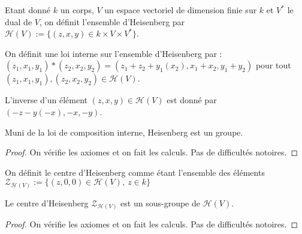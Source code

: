 \begin{definition}
    \label{def:heisenberg}
    \leanok

    Etant donné $k$ un corps, $V$ un espace vectoriel de dimension finie sur
    $k$ et $V^*$ le dual de $V$, on définit l'ensemble d'Heisenberg par 
    $\mathcal{H}(V):=\{(z,x,y) \in k\times V\times V^*\}$.
\end{definition}

\begin{definition}
    \label{def:mul_H}
    \leanok 

    On définit une loi interne sur l'ensemble d'Heisenberg par :
    $(z_1,x_1,y_1)*(z_2,x_2,y_2) = (z_1+z_2+y_1(x_2),x_1+x_2,y_1+y_2)$ pour
    tout $(z_1,x_1,y_1),(z_2,x_2,y_2)\in\mathcal{H}(V)$.
\end{definition}

\begin{definition}
    \label{def:inv_H}
    \leanok 

    L'inverse d'un élément $(z,x,y)\in\mathcal{H}(V)$ est donné par 
    $(-z- y(-x), - x ,- y)$.
\end{definition}

\begin{proposition}
    \label{prop:group_H}
    \leanok
    Muni de la loi de composition interne, Heisenberg est un groupe.
    \begin{proof}
        On vérifie les axiomes et on fait les calculs. Pas de difficultés
        notoires.
    \end{proof}
\end{proposition}

\begin{definition}
    \label{def:center_H}
    \leanok 

    On définit le centre d'Heisenberg comme étant l'ensemble des éléments
    $\mathcal{Z}_{\mathcal{H}(V)}:=\{(z,0,0)\in\mathcal{H}(V),\ z\in k\}$
\end{definition}

\begin{proposition}
    \label{prop:center_H_subgroup}
    \leanok

    Le centre d'Heisenberg $\mathcal{Z}_{\mathcal{H}(V)}$ est un sous-groupe
    de $\mathcal{H}(V)$.
    \begin{proof}
    On vérifie les axiomes et on fait les calculs. Pas de difficultés notoires.
    \end{proof}
\end{proposition}
